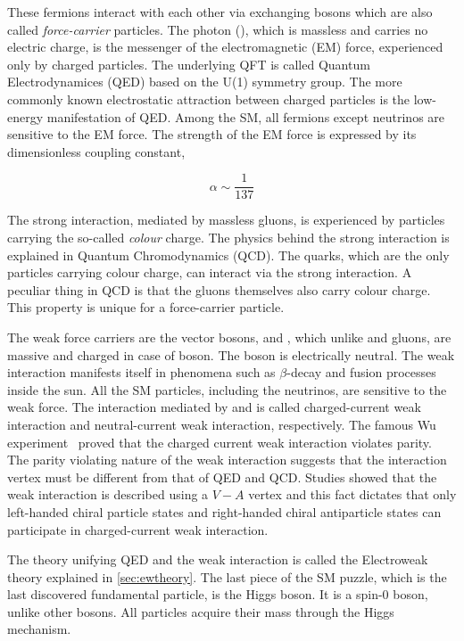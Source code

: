 These fermions interact with each other via exchanging bosons which are also called 
\textit{force-carrier} particles. The photon (\Pphoton), which is massless and carries no electric 
charge, is the messenger of the electromagnetic (EM) force, experienced only by charged particles.
The underlying QFT is called Quantum Electrodynamices (QED) based on the U(1) symmetry group. The more
commonly known electrostatic attraction between charged particles is the low-energy manifestation of QED. Among 
the SM, all fermions except neutrinos are sensitive to the EM force. The strength of the EM force
is expressed by its dimensionless coupling constant,

\begin{equation}
    \alpha \sim \frac{1}{137}
\end{equation}

The strong interaction, mediated by massless gluons, is experienced by particles 
carrying the so-called \textit{colour} charge. The physics behind the strong interaction is 
explained in Quantum Chromodynamics (QCD). The quarks, which are the only particles carrying colour charge,
can interact via the strong interaction. A peculiar thing in QCD is that the gluons themselves also 
carry colour charge. This property is unique for a force-carrier particle. 

The weak force carriers are the vector bosons, \PWpm and \PZ, which unlike \Pphoton and 
gluons, are massive and charged in case of \PWpm boson. The \PZ boson is electrically neutral. The weak
interaction manifests itself in phenomena such as $\beta$-decay and fusion processes inside the sun. All the
SM particles, including the neutrinos, are sensitive to the weak force. 
The interaction mediated by \PWpm and \PZ is called charged-current weak interaction and
neutral-current weak interaction, respectively. The famous Wu experiment~\cite{Wu:1957my} proved that 
the charged current weak interaction violates parity. The parity violating nature of the weak interaction
suggests that the interaction vertex must be different from that of QED and QCD. Studies showed that
the weak interaction is described using a $V-A$ vertex and this fact dictates that only left-handed
chiral particle states and right-handed chiral antiparticle states can participate in 
charged-current weak interaction. 

The theory unifying QED and the weak interaction is called the Electroweak theory explained in 
\cref{sec:ewtheory}. The last piece of the SM puzzle, which is the last discovered fundamental particle,
is the Higgs boson. It is a spin-0 boson, unlike other bosons. All particles acquire their mass 
through the Higgs mechanism.

